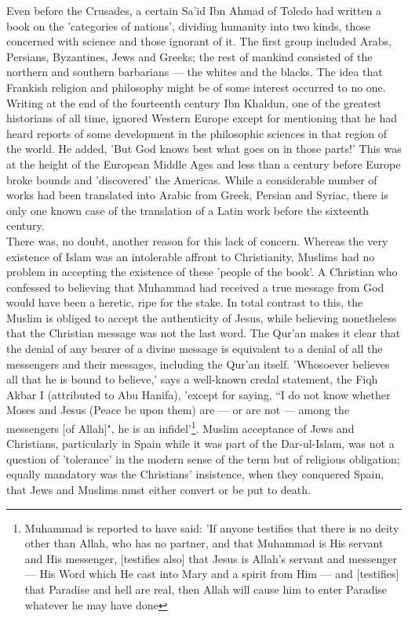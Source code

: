 \documentclass[10pt, twoside,openright]{book}
\begin{document}
Even before the Crusades, a certain Sa'id Ibn Ahmad of Toledo had written a book on the 'categories of nations', dividing humanity into two kinds, those concerned with science and those ignorant of it. The first group included Arabs, Persians, Byzantines, Jews and Greeks; the rest of mankind consisted of the northern and southern barbarians --- the whites and the blacks. The idea that Frankish religion and philosophy might be of some interest occurred to no one. Writing at the end of the fourteenth century Ibn Khaldun, one of the greatest historians of all time, ignored Western Europe except for mentioning that he had heard reports of some development in the philosophic sciences in that region of the world. He added, 'But God knows best what goes on in those parts!' This was at the height of the European Middle Ages and less than a century before Europe broke bounds and 'discovered' the Americas. While a considerable number of works had been translated into Arabic from Greek, Persian and Syriac, there is only one known case of the translation of a Latin work before the sixteenth century. \\

There was, no doubt, another reason for this lack of concern. Whereas the very existence of Islam was an intolerable affront to Christianity, Muslims had no problem in accepting the existence of these 'people of the book'. A Christian who confessed to believing that Muhammad had received a true message from God would have been a heretic, ripe for the stake. In total contrast to this, the Muslim is obliged to accept the authenticity of Jesus, while believing nonetheless that the Christian message was not the last word. The Qur'an makes it clear that the denial of any bearer of a divine message is equivalent to a denial of all the messengers and their messages, including the Qur'an itself. 'Whosoever believes all that he is bound to believe,' says a well\hyp{}known credal statement, the Fiqh Akbar I (attributed to Abu Hanifa), 'except for saying, ``I do not know whether Moses and Jesus (Peace be upon them) are --- or are not --- among the messengers [of Allah]", he is an infidel'\footnote{Muhammad is reported to have said: 'If anyone testifies that there is no deity other than Allah, who has no partner, and that Muhammad is His servant and His messenger, [testifies also] that Jesus is Allah's servant and messenger --- His Word which He cast into Mary and a spirit from Him --- and [testifies] that Paradise and hell are real, then Allah will cause him to enter Paradise whatever he may have done}. Muslim acceptance of Jews and Christians, particularly in Spain while it was part of the Dar\hyp{}ul\hyp{}Islam, was not a question of 'tolerance' in the modern sense of the term but of religious obligation; equally mandatory was the Christians' insistence, when they conquered Spain, that Jews and Muslims must either convert or be put to death. \\
\end{document}
